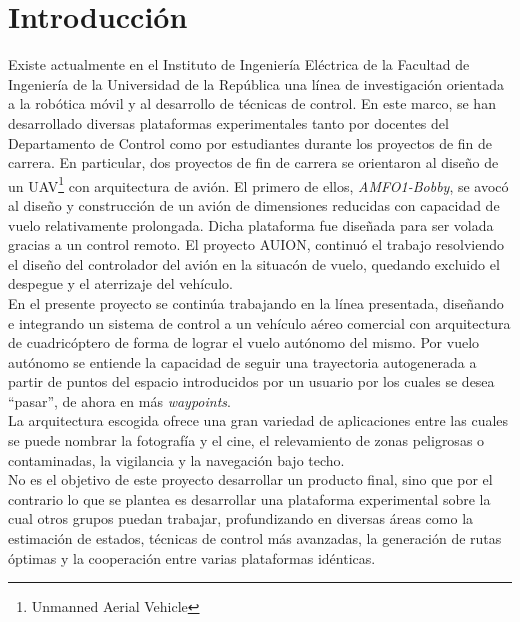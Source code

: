 \documentclass[main]{subfiles}
\begin{document}
\cleardoublepage
{}
{}
\chapter*{Introducci\'on}


Existe actualmente en el Instituto de Ingenier\'ia El\'ectrica de la Facultad de Ingenier\'ia de la Universidad de la Rep\'ublica una l\'inea de investigaci\'on orientada a la rob\'otica m\'ovil y al desarrollo de t\'ecnicas de control. En este marco, se han desarrollado diversas plataformas experimentales tanto por docentes del Departamento de Control como por estudiantes durante los proyectos de fin de carrera. En particular, dos proyectos de fin de carrera se orientaron al diseño de un UAV\footnote{Unmanned Aerial Vehicle} con arquitectura de avi\'on. El primero de ellos, \emph{AMFO1-Bobby}, se avoc\'o al diseño y construcci\'on de un avi\'on de dimensiones reducidas con capacidad de vuelo relativamente prolongada. Dicha plataforma fue dise\~nada para ser volada gracias a un control remoto. El proyecto AUION, continu\'o el trabajo resolviendo el diseño del controlador del avi\'on en la situac\'on de vuelo, quedando excluido el despegue y el aterrizaje del veh\'iculo.\\

En el presente proyecto se contin\'ua trabajando en la línea presentada, dise\~nando e integrando un sistema de control a un veh\'iculo a\'ereo comercial con arquitectura de cuadric\'optero de forma de lograr el vuelo aut\'onomo del mismo. Por vuelo aut\'onomo se entiende la capacidad de seguir una trayectoria autogenerada a partir de puntos del espacio introducidos por un usuario por los cuales se desea ``pasar'', de ahora en m\'as \emph{waypoints}. \\

La arquitectura escogida ofrece una gran variedad de aplicaciones entre las cuales se puede nombrar la fotograf\'ia y el cine, el relevamiento de zonas peligrosas o contaminadas, la  vigilancia y la navegaci\'on bajo techo. \\

No es el objetivo de este proyecto desarrollar un producto final, sino que por el contrario lo que se plantea es desarrollar una plataforma experimental sobre la cual otros grupos puedan trabajar, profundizando en diversas \'areas como la estimaci\'on de estados, t\'ecnicas de control m\'as avanzadas, la generaci\'on de rutas \'optimas y la cooperaci\'on entre varias plataformas id\'enticas.\\
\end{document}
